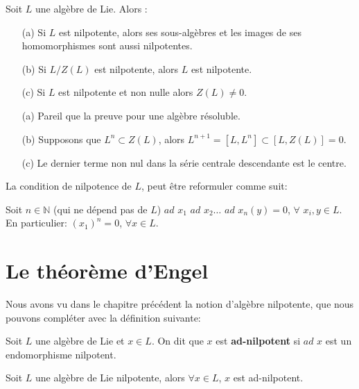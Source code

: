 \documentclass[a4paper,openany,12pt]{report}
\newcommand{\NN}{\mathbb{N}}
\theoremstyle{break}
{\theorembodyfont{\upshape}
\newtheorem*{rmq}{Remarque :}
\newtheorem*{prv}{Preuve :}
\newtheorem*{ex}{Exemples :}
\newtheorem*{exe}{Exemple : }
\newtheorem*{nota}{Notation :}
\newtheorem*{dem}{D\'emonstration :}}
\begin{document}
\begin{prop}\label{prop:nilp}
\quad Soit $L$ une algèbre de Lie. Alors :
\begin{itemize}
\item[(a)] Si $L$ est nilpotente, alors ses sous-algèbres et les images de ses homomorphismes sont aussi nilpotentes.

\item[(b)]  Si $L/Z(L)$ est nilpotente, alors $L$ est nilpotente.

\item[(c)] Si $L$ est nilpotente et non nulle alors $Z(L) \ne 0$.
\end{itemize}
\end{prop}

\begin{prv}
\begin{itemize}
\item[(a)]  Pareil que la preuve pour une algèbre résoluble.
\item[(b)]  Supposons que $L^n\subset Z(L)$, alors $L^{n+1}=[L,L^n]\subset [L,Z(L)]=0$.
\item[(c)] Le dernier terme non nul dans la série centrale descendante est le centre.
\end{itemize}
\end{prv}

\begin{rmq}
\quad La condition de nilpotence de $L$, peut être reformuler comme suit:

Soit $n \in \NN$ (qui ne dépend pas de $L$) $ad$ $x_{1}$ $ad$ $x_{2} \ldots$ $ad$ $x_{n}(y)=0$,  $\forall$ $x_{i}, y \in L$.
En particulier:
$(x_{1})^n=0$, $\forall x \in L$.
\end{rmq}

\chapter{Le théorème d'Engel}

\quad Nous avons vu dans le chapitre précédent la notion d'algèbre nilpotente, que nous pouvons compléter avec la définition suivante:

\begin{df}
\quad Soit $L$ une algèbre de Lie et $x \in L$. On dit que $x$ est \textbf{ad-nilpotent} si $ad$ $x$ est un endomorphisme nilpotent. 
\end{df}

\begin{prop}\label{prop:E1}
\quad Soit $L$ une algèbre de Lie nilpotente, alors $\forall x \in L$, $x$ est ad-nilpotent.
\end{prop}
\end{document}
